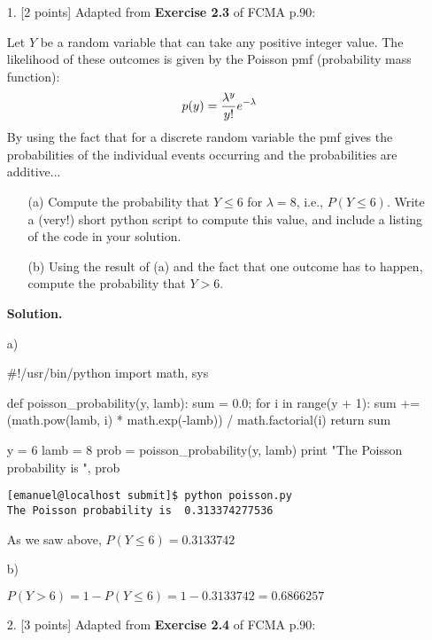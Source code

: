\documentclass[10pt]{article}
\begin{document}
\newpage
\begin{itemize}

\item[1.] [2 points]
Adapted from {\bf Exercise 2.3} of FCMA p.90:

Let $Y$ be a random variable that can take any positive integer value.  The likelihood of these outcomes is given by the Poisson pmf (probability mass function):
\begin{eqnarray}
p(y) = {\lambda^y\over y!} e^{-\lambda}
\end{eqnarray}
By using the fact that for a discrete random variable the pmf gives the probabilities of the individual events occurring and the probabilities are additive...
\begin{enumerate}
\item[(a)] Compute the probability that $Y \leq 6$ for $\lambda = 8$, i.e., $P(Y \leq 6)$.  Write a (very!) short python script to compute this value, and include a listing of the code in your solution.
\item[(b)] Using the result of (a) and the fact that one outcome has to happen, compute the probability that $Y > 6$.
\end{enumerate}

{\bf Solution.} 

a)

\begin{python}[caption={ {\tt poisson.py} script}, label=poisson]

#!/usr/bin/python
import math, sys

def poisson_probability(y, lamb):
	sum = 0.0;
	for i in range(y + 1):
		sum += (math.pow(lamb, i) * math.exp(-lamb)) / math.factorial(i)
	return sum
	
y = 6
lamb = 8
prob = poisson_probability(y, lamb)
print "The Poisson probability is ", prob

\end{python}

\begin{verbatim}
[emanuel@localhost submit]$ python poisson.py 
The Poisson probability is  0.313374277536

\end{verbatim}

As we saw above, $P(Y \leq 6) = 0.3133742$

b)

$P(Y > 6) = 1 - P(Y \leq 6) = 1 - 0.3133742 = 0.6866257$



\item[2.] [3 points]
Adapted from {\bf Exercise 2.4} of FCMA p.90:


\end{itemize}
\end{document}
